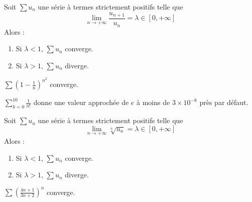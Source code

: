 	
	\begin{proposition}
		Soit $\sum u_n$ une série à termes strictement positifs telle que
		\[ \lim_{n \rightarrow +\infty} \frac{u_{n+1}}{u_n} = \lambda \in [0, +\infty] \]
		Alors :
		\begin{enumerate}[label=(\roman*)]
			\item Si $\lambda < 1$, $\sum u_n$ converge.
			\item Si $\lambda > 1$, $\sum u_n$ diverge.
		\end{enumerate}
	\end{proposition}
	
	
	\begin{example}
		$\sum \left( 1 - \frac{1}{n} \right)^{n^2}$ converge.
	\end{example}
	
	
	\begin{example}
		$\sum_{k=0}^{10} \frac{1}{n!}$ donne une valeur approchée de $e$ à moins de $3 \times 10^{-8}$ près par défaut.
	\end{example}
	
	
	\begin{proposition}
		Soit $\sum u_n$ une série à termes strictement positifs telle que
		\[ \lim_{n \rightarrow +\infty} \sqrt[n]{u_n} = \lambda \in [0, +\infty] \]
		Alors :
		\begin{enumerate}[label=(\roman*)]
			\item Si $\lambda < 1$, $\sum u_n$ converge.
			\item Si $\lambda > 1$, $\sum u_n$ diverge.
		\end{enumerate}
	\end{proposition}
	
	
	\begin{example}
		$\sum \left( \frac{4n+1}{3n+2} \right)^{n}$ converge.
	\end{example}

